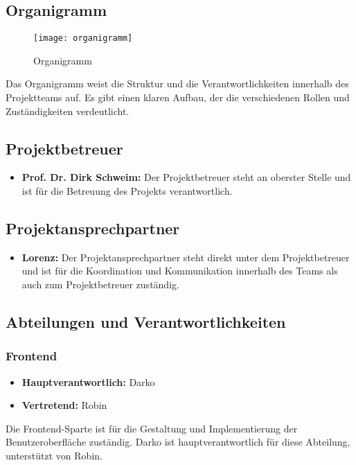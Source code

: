 \subsection{Organigramm}\label{subsec:Organigramm}

\begin{figure}[H]
    \centering
    \texttt{[image: organigramm]}
    \caption{Organigramm}
\end{figure}

Das Organigramm weist die Struktur und die Verantwortlichkeiten innerhalb des Projektteams auf. Es gibt einen klaren Aufbau, der die verschiedenen Rollen und Zuständigkeiten verdeutlicht.

\subsection{Projektbetreuer}
\begin{itemize}
    \item \textbf{Prof. Dr. Dirk Schweim:} Der Projektbetreuer steht an oberster Stelle und ist für die Betreuung des Projekts verantwortlich.
\end{itemize}

\subsection{Projektansprechpartner}
\begin{itemize}
    \item \textbf{Lorenz:} Der Projektansprechpartner steht direkt unter dem Projektbetreuer und ist für die Koordination und Kommunikation innerhalb des Teams als auch zum Projektbetreuer zuständig.
\end{itemize}

\subsection{Abteilungen und Verantwortlichkeiten}

\subsubsection{Frontend}
\begin{itemize}
    \item \textbf{Hauptverantwortlich:} Darko
    \item \textbf{Vertretend:} Robin
\end{itemize}
Die Frontend-Sparte ist für die Gestaltung und Implementierung der Benutzeroberfläche zuständig.
Darko ist hauptverantwortlich für diese Abteilung, unterstützt von Robin.

